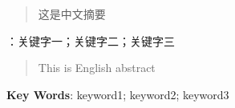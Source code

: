 \newpage
\fancyhead{}
\begin{abstract}
这是中文摘要
\end{abstract}

{：关键字一；关键字二；关键字三}

\newpage
{} %
\renewcommand{\abstractname}{\fontsize{14}{21}\textbf{Abstract}}
\fancyhead{}
\begin{abstract}
This is English abstract
\end{abstract}

{\noindent\textbf{Key Words}: keyword1; keyword2; keyword3}